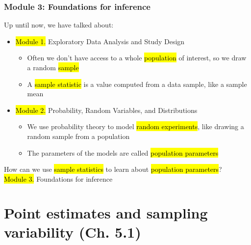 \documentclass[t,compress,mathserif]{beamer}
\begin{document}
\begin{frame}
    \frametitle{Module 3: Foundations for inference}

    Up until now, we have talked about:
    \begin{itemize}
        \item \hl{Module 1. }Exploratory Data Analysis and Study Design
        \begin{itemize}
            \item Often we don't have access to a whole \hl{population} of interest, so we draw a random \hl{sample}
            \item A \hl{sample statistic} is a value computed from a data sample, like a sample mean
        \end{itemize}
        \pause
        \item \hl{Module 2. }Probability, Random Variables, and Distributions
        \begin{itemize}
            \item We use probability theory to model \hl{random experiments}, like drawing a random sample from a population
            \item The parameters of the models are called \hl{population parameters}
        \end{itemize}
    \end{itemize}
   
    \pause
    \begin{center}
        How can we use \hl{sample statistics} to learn about \hl{population parameters}?\\
        \hl{Module 3. }Foundations for inference
    \end{center}
\end{frame}


\section{Point estimates and sampling variability (Ch. 5.1)}

\end{document}
